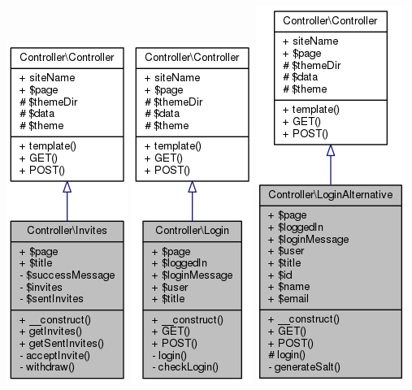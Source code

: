 \documentclass[11pt]{article}
\begin{document}
\includegraphics[scale=0.4]{UML_Controller_1_1Invites.png}
\includegraphics[scale=0.4]{UML_Controller_1_1Login.png}
\includegraphics[scale=0.4]{UML_Controller_1_1LoginAlternative.png}
\end{document}
